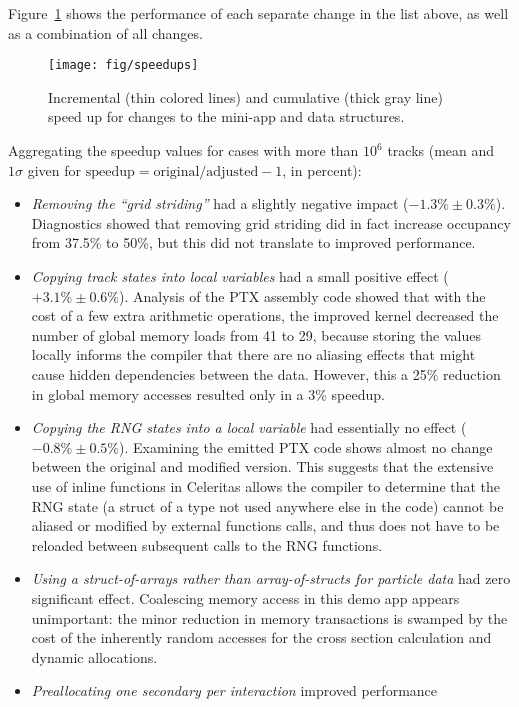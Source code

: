 \documentclass{webofc}
\begin{document}
Figure~\ref{fig:speedup} shows the performance of each separate change in the
list above, as well as a combination of all changes.
%
\begin{figure}[htb]
  \centering
  \texttt{[image: fig/speedups]}
  \caption{Incremental (thin colored lines) and cumulative (thick gray line)
  speed up for changes to the mini-app and data structures.}
  \label{fig:speedup}
\end{figure}

Aggregating the speedup values for cases with more than $10^6$ tracks (mean and
$1\sigma$ given for $\mbox{speedup}=\mbox{original}/\mbox{adjusted} - 1$, in
percent):
\begin{itemize}
  \item \emph{Removing the ``grid striding''} had a slightly negative impact
    ($-1.3\% \pm 0.3\%$). Diagnostics showed
    that removing grid striding did in fact increase occupancy from 37.5\% to
    50\%, but this did not translate to improved performance.
  \item \emph{Copying track states into local variables} had a small positive
    effect ($+3.1\% \pm 0.6\%$). Analysis of the PTX assembly code showed that
    with the cost of a few extra arithmetic operations, the improved kernel
    decreased the number of global memory loads from 41 to 29, because storing
    the values locally informs the compiler that there are no aliasing effects
    that might cause hidden dependencies between the data. However, this a 25\%
    reduction in global memory accesses resulted only in a 3\% speedup.
  \item \emph{Copying the RNG states into a local variable} had essentially no effect
    ($-0.8\% \pm 0.5\%$). Examining the emitted PTX code shows almost no change
    between the original and modified version. This suggests that the extensive
    use of inline functions in Celeritas allows the compiler to determine that
    the RNG state (a struct of a type not used anywhere else in the code) cannot
    be aliased or modified by external functions calls, and thus does not have
    to be reloaded between subsequent calls to the RNG functions.
  \item \emph{Using a struct-of-arrays rather than array-of-structs for particle
    data} had zero significant effect. Coalescing memory access in this demo app
    appears unimportant: the minor reduction in memory transactions is swamped
    by the cost of the inherently random accesses for the cross section
    calculation and dynamic allocations.
  \item \emph{Preallocating one secondary per interaction} improved performance

\end{itemize}
\end{document}
